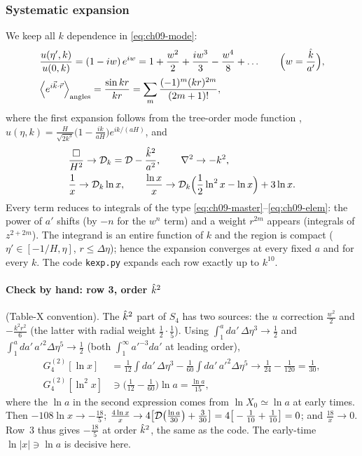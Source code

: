 \subsubsection{Systematic expansion}
We keep all $k$ dependence in \eqref{eq:ch09-mode}:
\begin{equation}
\begin{aligned}
&\frac{u(\eta',k)}{u(0,k)}=(1-iw)\,e^{iw}=1+\frac{w^2}2+\frac{iw^3}3-\frac{w^4}8+\ldots\qquad\Big(w=\frac{\hat k}{a'}\Big),\\
&\Big\langle e^{i\vec k\cdot\vec r}\Big\rangle_{\rm angles}=\frac{\sin kr}{kr}=\sum_m\frac{(-1)^m(kr)^{2m}}{(2m+1)!},
\end{aligned}
\label{eq:ch09-kser}
\end{equation}
where the first expansion follows from the tree-order mode function , $u(\eta,k)=\frac{H}{\sqrt{2k^3}}\big(1-\frac{ik}{aH}\big)e^{ik/(aH)}$, and
\begin{equation}
\begin{aligned}
&\frac{\square}{H^2}\to\mathcal{D}_k=\mathcal{D}-\frac{\hat k^2}{a^2},\qquad \nabla^2\to-k^2,\\
&\frac1x\to\mathcal{D}_k\ln x,\qquad \frac{\ln x}x\to\mathcal{D}_k\Big(\frac12\ln^2x-\ln x\Big)+3\ln x .
\end{aligned}
\label{eq:ch09-krules}
\end{equation}
Every term reduces to integrals of the type \eqref{eq:ch09-master}--\eqref{eq:ch09-elem}: the power of $a'$ shifts (by $-n$ for the $w^n$ term) and a weight $r^{2m}$
appears (integrals of $z^{2+2m}$). The integrand is an entire function of $k$ and the region is compact ($\eta'\in[-1/H,\eta]$, $r\le\Delta\eta$);
hence the expansion converges at every fixed $a$ and for every $k$. The code \texttt{kexp.py} expands each row exactly up to $k^{10}$.

\paragraph{Check by hand: row 3, order $\hat k^2$} (Table-X convention). The $\hat k^2$ part of $S_4$ has two sources: the $u$ correction $\tfrac{w^2}{2}$ and $-\tfrac{k^2r^2}6$
(the latter with radial weight $\tfrac12\cdot\tfrac15$). Using $\int_1^a da'\,\Delta\eta^3\to\tfrac12$ and $\int_1^a da'\,a'^2\Delta\eta^5\to\tfrac12$ (both $\int_1^\infty a'^{-3}da'$ at leading order),
\begin{equation}
\begin{aligned}
G^{(2)}_4[\ln x]&=\frac1{12}\int\!da'\,\Delta\eta^3-\frac1{60}\int\!da'\,a'^2\Delta\eta^5\to\frac1{24}-\frac1{120}=\frac1{30},\\
G^{(2)}_4[\ln^2x]&\ni\Big(\frac1{12}-\frac1{60}\Big)\ln a=\frac{\ln a}{15},
\end{aligned}
\label{eq:ch09-G2}
\end{equation}
where the $\ln a$ in the second expression comes from $\ln X_0\simeq\ln a$ at early times. Then
$-108\ln x\to-\tfrac{18}5$; $\tfrac{4\ln x}x\to4\big[\mathcal{D}\big(\tfrac{\ln a}{30}\big)+\tfrac3{30}\big]=4\big[-\tfrac1{10}+\tfrac1{10}\big]=0$; and $\tfrac{18}x\to0$.
Row~3 thus gives $-\tfrac{18}5$ at order $\hat k^2$, the same as the code. The early-time $\ln|x|\ni\ln a$ is decisive here.

